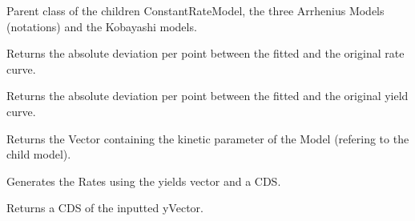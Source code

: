 \documentclass[letterpaper,10pt,english]{sphinxmanual}
\begin{document}
\begin{fulllineitems}
\label{FittingClasses:Models.Model}
Parent class of the children ConstantRateModel, the three Arrhenius Models (notations) and the Kobayashi models.

\begin{fulllineitems}
\label{FittingClasses:Models.Model.ErrorRate}
Returns the absolute deviation per point between the fitted and the original rate curve.

\end{fulllineitems}


\begin{fulllineitems}
\label{FittingClasses:Models.Model.ErrorYield}
Returns the absolute deviation per point between the fitted and the original yield curve.

\end{fulllineitems}


\begin{fulllineitems}
\label{FittingClasses:Models.Model.ParamVector}
Returns the Vector containing the kinetic parameter of the Model (refering to the child model).

\end{fulllineitems}


\begin{fulllineitems}
\label{FittingClasses:Models.Model.calcRate}
Generates the Rates using the yields vector and a CDS.

\end{fulllineitems}


\begin{fulllineitems}
\label{FittingClasses:Models.Model.deriveC}
Returns a CDS of the inputted yVector.


\end{fulllineitems}
\end{fulllineitems}
\end{document}

